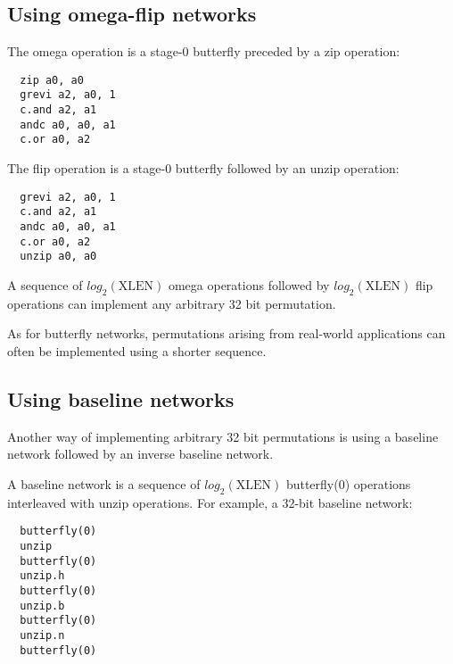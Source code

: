 
\subsection{Using omega-flip networks}

The omega operation is a stage-0 butterfly preceded by a zip operation:

\begin{verbatim}
  zip a0, a0
  grevi a2, a0, 1
  c.and a2, a1
  andc a0, a0, a1
  c.or a0, a2
\end{verbatim}

The flip operation is a stage-0 butterfly followed by an unzip operation:

\begin{verbatim}
  grevi a2, a0, 1
  c.and a2, a1
  andc a0, a0, a1
  c.or a0, a2
  unzip a0, a0
\end{verbatim}

A sequence of $log_2(\textrm{XLEN})$ omega operations followed by
$log_2(\textrm{XLEN})$ flip operations can implement any arbitrary 32 bit
permutation.

As for butterfly networks, permutations arising from real-world applications
can often be implemented using a shorter sequence.


\subsection{Using baseline networks}

Another way of implementing arbitrary 32 bit permutations is using a
baseline network followed by an inverse baseline network.

A baseline network is a sequence of $log_2(\textrm{XLEN})$ butterfly(0)
operations interleaved with unzip operations. For example, a 32-bit
baseline network:

\begin{verbatim}
  butterfly(0)
  unzip
  butterfly(0)
  unzip.h
  butterfly(0)
  unzip.b
  butterfly(0)
  unzip.n
  butterfly(0)
\end{verbatim}

